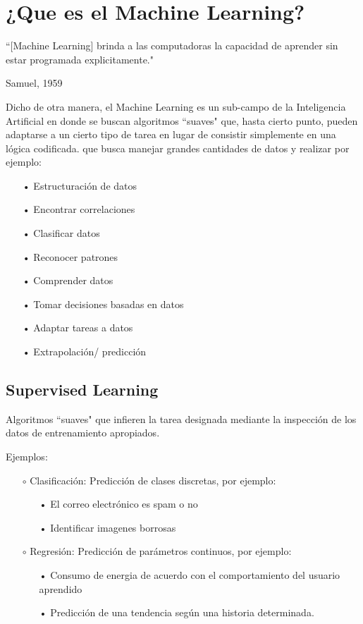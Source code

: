 \documentclass[12pt,a4paper]{book}
\begin{document}
\section{¿Que es el Machine Learning?}
\begin{blockquote}
``[Machine Learning] brinda a las computadoras la capacidad de aprender sin estar programada explicitamente."

\noindent\hfill
Samuel, 1959
\end{blockquote}
\bigskip

Dicho de otra manera, el Machine Learning es un sub-campo de la Inteligencia Artificial en donde se buscan algoritmos ``suaves" que, hasta cierto punto, pueden adaptarse a un cierto tipo de tarea en lugar de consistir simplemente en una lógica codificada. que busca manejar grandes cantidades de datos y realizar por ejemplo:
\begin{enumerate}
\item[•] Estructuración de datos
\item[•] Encontrar correlaciones
\item[•] Clasificar datos
\item[•] Reconocer patrones
\item[•] Comprender datos
\item[•] Tomar decisiones basadas en datos
\item[•] Adaptar tareas a datos
\item[•] Extrapolación/ predicción
\end{enumerate} 
\subsection{Supervised Learning}
Algoritmos ``suaves" que infieren la tarea designada mediante la inspección de los datos de entrenamiento apropiados.

Ejemplos:
\begin{enumerate}
 \item[$\circ$] Clasificación: Predicción de clases discretas, por ejemplo:
 \begin{enumerate}
  \item[•] El correo electrónico es spam o no
  \item[•] Identificar imagenes borrosas
 \end{enumerate}
 \item[$\circ$] Regresión: Predicción de parámetros continuos, por ejemplo:
  \begin{enumerate}
  \item[•] Consumo de energia de acuerdo con el comportamiento del usuario aprendido
  \item[•] Predicción de una tendencia según una historia determinada.
  \end{enumerate}
\end{enumerate}
\end{document}
